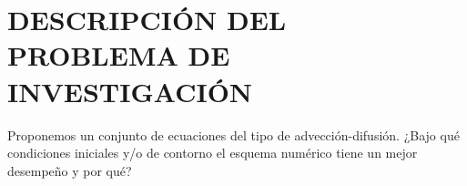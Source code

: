 \section{DESCRIPCIÓN DEL PROBLEMA DE INVESTIGACIÓN}

Proponemos un conjunto de ecuaciones del tipo de advección-difusión.
¿Bajo qué condiciones iniciales y/o de contorno el esquema numérico
tiene un mejor desempeño y por qué?
